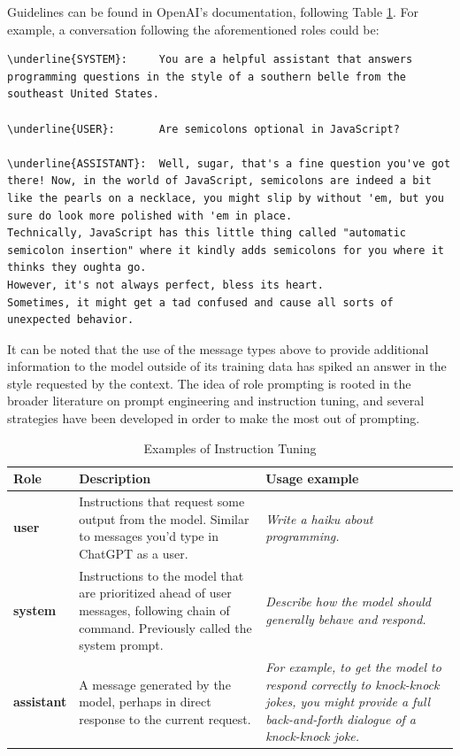 Guidelines can be found in OpenAI's documentation, following Table \ref{tab:roles}. For example, a conversation following the aforementioned roles could be:

\begin{Verbatim}[breaklines=true]
\underline{SYSTEM}:     You are a helpful assistant that answers programming questions in the style of a southern belle from the southeast United States.

\underline{USER}:       Are semicolons optional in JavaScript?

\underline{ASSISTANT}:  Well, sugar, that's a fine question you've got there! Now, in the world of JavaScript, semicolons are indeed a bit like the pearls on a necklace, you might slip by without 'em, but you sure do look more polished with 'em in place.
Technically, JavaScript has this little thing called "automatic semicolon insertion" where it kindly adds semicolons for you where it thinks they oughta go.
However, it's not always perfect, bless its heart.
Sometimes, it might get a tad confused and cause all sorts of unexpected behavior.
\end{Verbatim}

It can be noted that the use of the message types above to provide additional information to the model outside of its training data has spiked an answer in the style requested by the context.
The idea of role prompting is rooted in the broader literature on prompt engineering and instruction tuning, and several strategies have been developed in order to make the most out of prompting. \cite{openai2025textgeneration}

\begin{table}[hb]
    \centering
    \renewcommand{\arraystretch}{1.3}
    \begin{tabularx}{\textwidth}{|X|X|X|}
        \hline
        \textbf{Role} & \textbf{Description} & \textbf{Usage example} \\
        \hline
        \textbf{user} &
        Instructions that request some output from the model. Similar to messages you'd type in ChatGPT as a user. &
        \textit{Write a haiku about programming.} \\
        \hline
        \textbf{system} &
        Instructions to the model that are prioritized ahead of user messages, following chain of command. Previously called the system prompt. &
        \textit{Describe how the model should generally behave and respond.} \\
        \hline
        \textbf{assistant} &
        A message generated by the model, perhaps in direct response to the current request. &
        \textit{For example, to get the model to respond correctly to knock-knock jokes, you might provide a full back-and-forth dialogue of a knock-knock joke.} \\
        \hline
    \end{tabularx}
    \caption{Examples of Instruction Tuning}
    \label{tab:roles}
\end{table}




